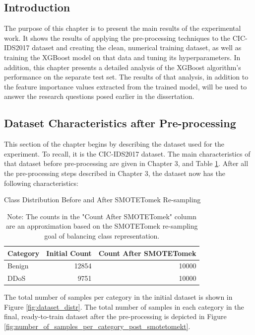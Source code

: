 \subsection{Introduction}

The purpose of this chapter is to present the main results of the experimental work. It shows the results of applying the pre-processing techniques to the CIC-IDS2017 dataset and creating the clean, numerical training dataset, as well as training the XGBoost model on that data and tuning its hyperparameters. In addition, this chapter presents a detailed analysis of the XGBoost algorithm’s performance on the separate test set. The results of that analysis, in addition to the feature importance values extracted from the trained model, will be used to answer the research questions posed earlier in the dissertation.

\subsection{Dataset Characteristics after Pre-processing}

This section of the chapter begins by describing the dataset used for the experiment. To recall, it is the CIC-IDS2017 dataset. The main characteristics of that dataset before pre-processing are given in Chapter 3, and Table \ref{tab:cic_ids2017_dataset_initial_characteristics}. After all the pre-processing steps described in Chapter 3, the dataset now has the following characteristics:\\
\begin{table}[h!]
	\centering
	\caption{Class Distribution Before and After SMOTETomek Re-sampling}
	\label{tab:cic_ids2017_dataset_initial_characteristics}
	\begin{tabular}{lrr}
		\toprule
		\textbf{Category} & \textbf{Initial Count} & \textbf{Count After SMOTETomek} \\
		\midrule
		Benign & 12854 & 10000 \\
		DDoS & 9751 & 10000 \\
		\bottomrule
	\end{tabular}
	\vspace{0.5em}
	\small
	\caption*{Note: The counts in the "Count After SMOTETomek" column are an approximation based on the SMOTETomek re-sampling goal of balancing class representation.}
\end{table}

The total number of samples per category in the initial dataset is shown in Figure \ref{fig:dataset_distr}. The total number of samples in each category in the final, ready-to-train dataset after the pre-processing is depicted in Figure \ref{fig:number_of_samples_per_category_post_smotetomekt}.

